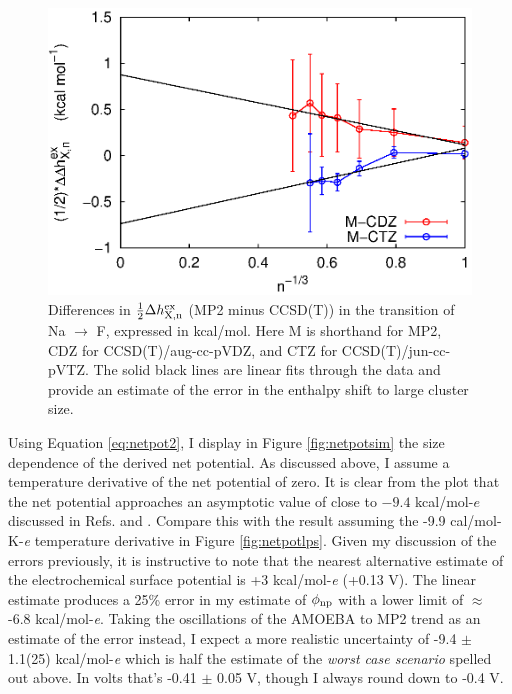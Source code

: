 \begin{cpa}
\begin{figure}
 \begin{center}
  \includegraphics[width=0.98\linewidth]{images/cpa/deltaH_ccsdt_fit.eps}
 \end{center}
\caption[Estimated error in the MP2-level enthalpy relative to CCSD(T)]{Differences in $\frac{1}{2}\Delta h^{\mathrm{ex}}_{\mathrm{X,n}}$ (MP2 minus CCSD(T)) in the transition of Na 
$\rightarrow$ F, expressed in kcal/mol. Here M is shorthand for MP2, CDZ for CCSD(T)/aug-cc-pVDZ, and CTZ for CCSD(T)/jun-cc-pVTZ. The solid black lines are linear fits 
through the data and provide an estimate of the error in the enthalpy shift to large cluster size.}
\label{fig:ccsdterror}
\end{figure}

  Using Equation \ref{eq:netpot2}, I display in Figure \ref{fig:netpotsim} the size dependence of the derived net potential. As discussed above, I assume a
  temperature derivative of the net potential of zero. It is clear from the plot that the net potential approaches an asymptotic value of close to $-9.4$ kcal/mol-$e$
  discussed in Refs. \cite{beck2013sp} and \cite{pollard2014cpa1}. Compare this with the result assuming the -9.9 cal/mol-K-\emph{e} temperature derivative in Figure
  \ref{fig:netpotlps}. Given my discussion of the errors previously, it is instructive to note that the nearest alternative estimate of the electrochemical surface 
  potential is +3 kcal/mol-\emph{e} (+0.13 V). The linear estimate produces a 25\% error in my estimate of $\phi_{\mathrm{np}}$ with a lower limit of $\approx~$-6.8 kcal/mol-\emph{e}. 
  Taking the oscillations of the AMOEBA to MP2 trend as an estimate of the error instead, I expect a more realistic uncertainty of -9.4 $\pm$ 1.1(25) kcal/mol-\emph{e} which
  is half the estimate of the \emph{worst case scenario} spelled out above. In volts that's -0.41 $\pm$ 0.05 V, though I always round down to -0.4 V.
  

\end{cpa}
